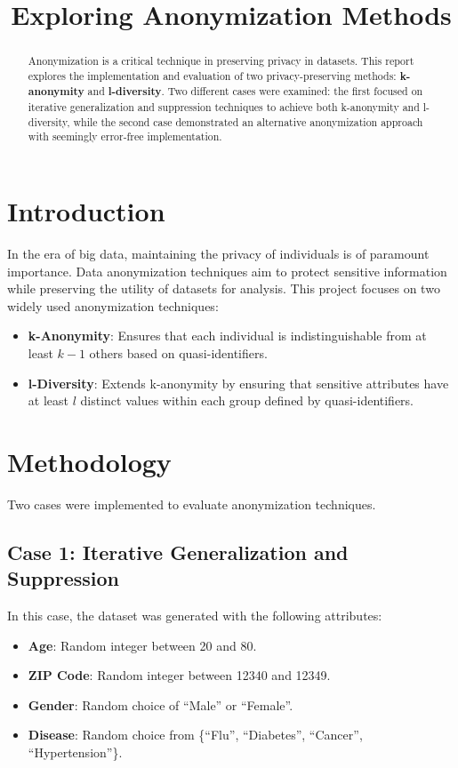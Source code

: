 \documentclass[conference]{IEEEtran}
\title{Exploring Anonymization Methods}
\author{\IEEEauthorblockN{Tianci Xie and Haochun Qi}}
\begin{document}
	
	\maketitle
	
	\begin{abstract}
		Anonymization is a critical technique in preserving privacy in datasets. This report explores the implementation and evaluation of two privacy-preserving methods: \textbf{k-anonymity} and \textbf{l-diversity}. Two different cases were examined: the first focused on iterative generalization and suppression techniques to achieve both k-anonymity and l-diversity, while the second case demonstrated an alternative anonymization approach with seemingly error-free implementation. 
	\end{abstract}
	
	\section{Introduction}
	In the era of big data, maintaining the privacy of individuals is of paramount importance. Data anonymization techniques aim to protect sensitive information while preserving the utility of datasets for analysis. This project focuses on two widely used anonymization techniques:
	\begin{itemize}
		\item \textbf{k-Anonymity}: Ensures that each individual is indistinguishable from at least $k-1$ others based on quasi-identifiers.
		\item \textbf{l-Diversity}: Extends k-anonymity by ensuring that sensitive attributes have at least $l$ distinct values within each group defined by quasi-identifiers.
	\end{itemize}
	
	\section{Methodology}
	Two cases were implemented to evaluate anonymization techniques.
	
	\subsection{Case 1: Iterative Generalization and Suppression}
	In this case, the dataset was generated with the following attributes:
	\begin{itemize}
		\item \textbf{Age}: Random integer between 20 and 80.
		\item \textbf{ZIP Code}: Random integer between 12340 and 12349.
		\item \textbf{Gender}: Random choice of ``Male'' or ``Female''.
		\item \textbf{Disease}: Random choice from \{``Flu'', ``Diabetes'', ``Cancer'', ``Hypertension''\}.
	\end{itemize}
	
\end{document}
